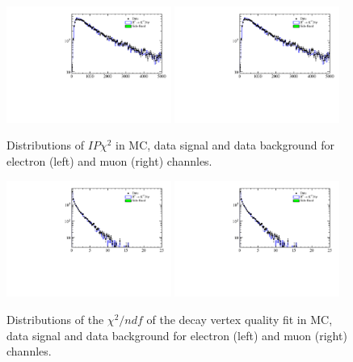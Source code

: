 \begin{figure}[h!]
\centering
\includegraphics[width=0.48\textwidth]{RKst/figs/MC_data_comp/EE/drawVariables_Kst_IPCHI2_OWNPV.pdf}
\includegraphics[width=0.48\textwidth]{RKst/figs/MC_data_comp/MM/drawVariables_Kst_IPCHI2_OWNPV.pdf}
\caption{ Distributions of \Kstar $IP\chi^2$ in MC, data signal and data background for electron (left) and muon (right) channles.   }
\end{figure}

\begin{figure}[h!]
\centering
\includegraphics[width=0.48\textwidth]{RKst/figs/MC_data_comp/EE/drawVariables_Kst_ENDVERTEX_CHI2_Kst_ENDVERTEX_NDOF.pdf}
\includegraphics[width=0.48\textwidth]{RKst/figs/MC_data_comp/MM/drawVariables_Kst_ENDVERTEX_CHI2_Kst_ENDVERTEX_NDOF.pdf}
\caption{ Distributions of the $\chi^2/ndf$ of the \Kstar decay vertex quality fit in MC, data signal and data background for electron (left) and muon (right) channles.   }
\end{figure}








